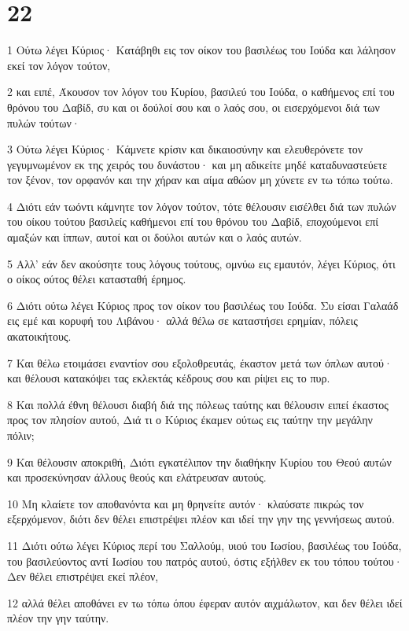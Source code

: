 \chapter{22}

\par 1 Ούτω λέγει Κύριος· Κατάβηθι εις τον οίκον του βασιλέως του Ιούδα και λάλησον εκεί τον λόγον τούτον,
\par 2 και ειπέ, Άκουσον τον λόγον του Κυρίου, βασιλεύ του Ιούδα, ο καθήμενος επί του θρόνου του Δαβίδ, συ και οι δούλοί σου και ο λαός σου, οι εισερχόμενοι διά των πυλών τούτων·
\par 3 Ούτω λέγει Κύριος· Κάμνετε κρίσιν και δικαιοσύνην και ελευθερόνετε τον γεγυμνωμένον εκ της χειρός του δυνάστου· και μη αδικείτε μηδέ καταδυναστεύετε τον ξένον, τον ορφανόν και την χήραν και αίμα αθώον μη χύνετε εν τω τόπω τούτω.
\par 4 Διότι εάν τωόντι κάμνητε τον λόγον τούτον, τότε θέλουσιν εισέλθει διά των πυλών του οίκου τούτου βασιλείς καθήμενοι επί του θρόνου του Δαβίδ, εποχούμενοι επί αμαξών και ίππων, αυτοί και οι δούλοι αυτών και ο λαός αυτών.
\par 5 Αλλ' εάν δεν ακούσητε τους λόγους τούτους, ομνύω εις εμαυτόν, λέγει Κύριος, ότι ο οίκος ούτος θέλει κατασταθή έρημος.
\par 6 Διότι ούτω λέγει Κύριος προς τον οίκον του βασιλέως του Ιούδα. Συ είσαι Γαλαάδ εις εμέ και κορυφή του Λιβάνου· αλλά θέλω σε καταστήσει ερημίαν, πόλεις ακατοικήτους.
\par 7 Και θέλω ετοιμάσει εναντίον σου εξολοθρευτάς, έκαστον μετά των όπλων αυτού· και θέλουσι κατακόψει τας εκλεκτάς κέδρους σου και ρίψει εις το πυρ.
\par 8 Και πολλά έθνη θέλουσι διαβή διά της πόλεως ταύτης και θέλουσιν ειπεί έκαστος προς τον πλησίον αυτού, Διά τι ο Κύριος έκαμεν ούτως εις ταύτην την μεγάλην πόλιν;
\par 9 Και θέλουσιν αποκριθή, Διότι εγκατέλιπον την διαθήκην Κυρίου του Θεού αυτών και προσεκύνησαν άλλους θεούς και ελάτρευσαν αυτούς.
\par 10 Μη κλαίετε τον αποθανόντα και μη θρηνείτε αυτόν· κλαύσατε πικρώς τον εξερχόμενον, διότι δεν θέλει επιστρέψει πλέον και ιδεί την γην της γεννήσεως αυτού.
\par 11 Διότι ούτω λέγει Κύριος περί του Σαλλούμ, υιού του Ιωσίου, βασιλέως του Ιούδα, του βασιλεύοντος αντί Ιωσίου του πατρός αυτού, όστις εξήλθεν εκ του τόπου τούτου· Δεν θέλει επιστρέψει εκεί πλέον,
\par 12 αλλά θέλει αποθάνει εν τω τόπω όπου έφεραν αυτόν αιχμάλωτον, και δεν θέλει ιδεί πλέον την γην ταύτην.
